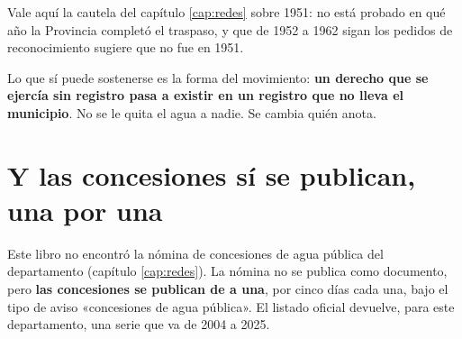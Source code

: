 \begin{cautela}
Vale aquí la cautela del capítulo \ref{cap:redes} sobre 1951: no está probado en qué año la Provincia completó el traspaso, y que de 1952 a 1962 sigan los pedidos de reconocimiento sugiere que no fue en 1951.

Lo que sí puede sostenerse es la forma del movimiento: \textbf{un derecho que se ejercía sin
registro pasa a existir en un registro que no lleva el municipio}. No se le quita el agua a
nadie. Se cambia quién anota.
\end{cautela}

\section{Y las concesiones sí se publican, una por una}

Este libro no encontró la nómina de concesiones de agua pública del departamento (capítulo \ref{cap:redes}).
La nómina no se publica como documento, pero \textbf{las concesiones se publican de a una}, por
cinco días cada una, bajo el tipo de aviso «concesiones de agua pública». El listado oficial
devuelve, para este departamento, una serie que va de 2004 a 2025.

